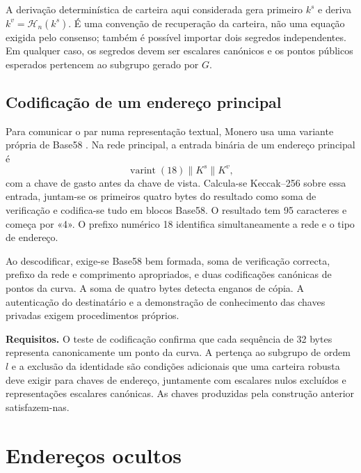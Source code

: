 A derivação determinística de carteira aqui considerada gera primeiro
\(k^s\) e deriva \(k^v=\mathcal H_n(k^s)\). É uma convenção de
recuperação da carteira, não uma equação exigida pelo consenso; também é
possível importar dois segredos independentes. Em qualquer caso, os segredos
devem ser escalares canónicos e os pontos públicos esperados pertencem ao
subgrupo gerado por \(G\).

\subsection*{Codificação de um endereço principal}

%
Para comunicar o par numa representação textual, Monero usa uma variante
própria de Base58 \cite{base-58-encoding,luigi-address}. Na rede principal, a entrada
binária de um endereço principal é
\[
 \operatorname{varint}(18)\mathbin\|K^s\mathbin\|K^v,
\]
com a chave de gasto antes da chave de vista. Calcula-se Keccak--256 sobre essa entrada,
juntam-se os primeiros quatro bytes do resultado como soma de verificação e
codifica-se tudo em blocos Base58. O resultado tem 95 caracteres e começa
por «4». O prefixo numérico 18 identifica simultaneamente a rede e
o tipo de endereço.


Ao descodificar, exige-se Base58 bem formada, soma de verificação
correcta, prefixo da rede e comprimento apropriados, e duas codificações
canónicas de pontos da curva. A soma de quatro bytes detecta enganos de cópia.
A autenticação do destinatário e a demonstração de conhecimento das chaves
privadas exigem procedimentos próprios.

\textbf{Requisitos.} O teste de codificação confirma que cada sequência de
32 bytes representa canonicamente um ponto da curva. A pertença ao subgrupo
de ordem \(l\) e a exclusão da identidade são condições adicionais que uma
carteira robusta deve exigir para chaves de endereço, juntamente com escalares
nulos excluídos e representações escalares canónicas. As chaves produzidas
pela construção anterior satisfazem-nas.



\section{Endereços ocultos}
\label{sec:one-time-addresses}

